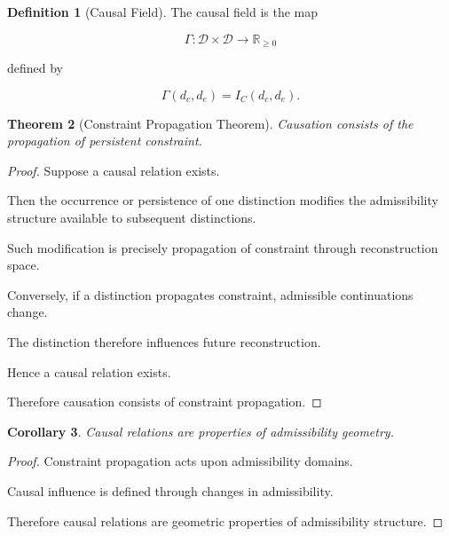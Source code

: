 \documentclass[12pt,oneside]{article}
\newtheorem{theorem}{Theorem}[section] \newtheorem{lemma}[theorem]{Lemma} \newtheorem{proposition}[theorem]{Proposition} \newtheorem{corollary}[theorem]{Corollary}
\theoremstyle{definition}
\newtheorem{definition}[theorem]{Definition} \newtheorem{axiom}[theorem]{Axiom} \newtheorem{remark}[theorem]{Remark} \newtheorem{example}[theorem]{Example}
\begin{document}
\begin{definition}[Causal Field]

The causal field is the map

\[
\Gamma :
\mathcal D \times \mathcal D
\rightarrow
\mathbb R_{\ge 0}
\]

defined by

\[
\Gamma(d_c,d_e)
=
I_C(d_c,d_e).
\]

\end{definition}

\begin{theorem}[Constraint Propagation Theorem]

Causation consists of the propagation of persistent constraint.

\end{theorem}

\begin{proof}

Suppose a causal relation exists.

Then the occurrence or persistence of one distinction modifies the admissibility structure available to subsequent distinctions.

Such modification is precisely propagation of constraint through reconstruction space.

Conversely, if a distinction propagates constraint, admissible continuations change.

The distinction therefore influences future reconstruction.

Hence a causal relation exists.

Therefore causation consists of constraint propagation.

\end{proof}

\begin{corollary}

Causal relations are properties of admissibility geometry.

\end{corollary}

\begin{proof}

Constraint propagation acts upon admissibility domains.

Causal influence is defined through changes in admissibility.

Therefore causal relations are geometric properties of admissibility structure.

\end{proof}
\end{document}

